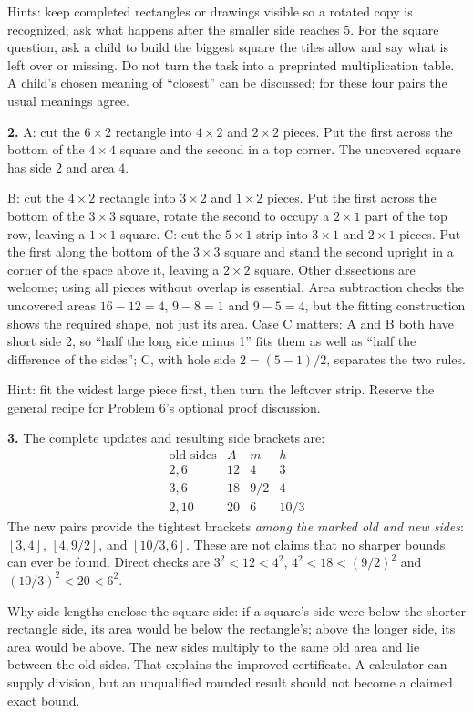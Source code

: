 \documentclass[11pt,letterpaper]{article}
\begin{document}
Hints: keep completed rectangles or drawings visible so a rotated copy is recognized; ask what happens after the smaller side reaches $5$. For the square question, ask a child to build the biggest square the tiles allow and say what is left over or missing. Do not turn the task into a preprinted multiplication table. A child's chosen meaning of ``closest'' can be discussed; for these four pairs the usual meanings agree.

\textbf{2.} A: cut the $6\times2$ rectangle into $4\times2$ and $2\times2$ pieces. Put the first across the bottom of the $4\times4$ square and the second in a top corner. The uncovered square has side $2$ and area $4$.

B: cut the $4\times2$ rectangle into $3\times2$ and $1\times2$ pieces. Put the first across the bottom of the $3\times3$ square, rotate the second to occupy a $2\times1$ part of the top row, leaving a $1\times1$ square. C: cut the $5\times1$ strip into $3\times1$ and $2\times1$ pieces. Put the first along the bottom of the $3\times3$ square and stand the second upright in a corner of the space above it, leaving a $2\times2$ square. Other dissections are welcome; using all pieces without overlap is essential. Area subtraction checks the uncovered areas $16-12=4$, $9-8=1$ and $9-5=4$, but the fitting construction shows the required shape, not just its area. Case C matters: A and B both have short side 2, so ``half the long side minus 1'' fits them as well as ``half the difference of the sides''; C, with hole side $2=(5-1)/2$, separates the two rules.

Hint: fit the widest large piece first, then turn the leftover strip. Reserve the general recipe for Problem 6's optional proof discussion.

\textbf{3.} The complete updates and resulting side brackets are:
\[
\begin{array}{c|c|c|c}
\text{old sides}&A&m&h\\\hline
2,6&12&4&3\\
3,6&18&9/2&4\\
2,10&20&6&10/3
\end{array}
\]
The new pairs provide the tightest brackets \emph{among the marked old and new sides}: $[3,4]$, $[4,9/2]$, and $[10/3,6]$. These are not claims that no sharper bounds can ever be found. Direct checks are $3^2<12<4^2$, $4^2<18<(9/2)^2$ and $(10/3)^2<20<6^2$.

Why side lengths enclose the square side: if a square's side were below the shorter rectangle side, its area would be below the rectangle's; above the longer side, its area would be above. The new sides multiply to the same old area and lie between the old sides. That explains the improved certificate. A calculator can supply division, but an unqualified rounded result should not become a claimed exact bound.
\end{document}
